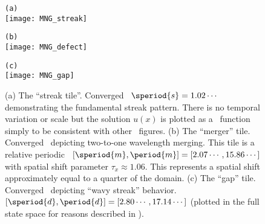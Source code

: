 \begin{figure}
\begin{minipage}[height=.2\textheight]{\textwidth}
\centering \small{\texttt{(a)}}\\
\texttt{[image: MNG\_streak]}
\end{minipage}
\begin{minipage}[height=.2\textheight]{.5\textwidth}
\centering \small{\texttt{(b)}}\\
\texttt{[image: MNG\_defect]}
\end{minipage}
\begin{minipage}[height=.2\textheight]{.5\textwidth}
\centering \small{\texttt{(c)}}\\
\texttt{[image: MNG\_gap]}
\end{minipage}
\caption{ \label{fig:tiles}
(a) The ``streak tile''. Converged \eqv\
$\speriod{s}=1.02\cdots$ demonstrating the fundamental streak
pattern. There
is no temporal variation or scale but the solution $u(x)$ is plotted
as a \spt\ function simply to be consistent with other \spt\ figures.
(b) The ``merger'' tile. Converged \twot\
depicting two-to-one wavelength merging.
This tile is a relative periodic \twot\
$[\speriod{m},\period{m}]=[2.07\cdots,15.86\cdots]$
with spatial shift parameter $\tau_x \approx 1.06$. This
represents a spatial shift approximately equal to a quarter of the domain.
(c) The ``gap'' tile. Converged \twot\
depicting ``wavy streak'' behavior.
$[\speriod{d},\period{d}]=[2.80\cdots,17.14\cdots]$ (plotted in
the full state space for reasons described in \refsect{sect:tiles}).
}
\end{figure}

